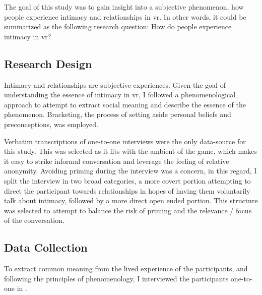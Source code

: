 
The goal of this study was to gain insight into a subjective phenomenon, how people experience intimacy and relationships in \gls{vr}.
In other words, it could be summarized as the following research question: How do people experience intimacy in \gls{vr}?


\subsection{Research Design}

Intimacy and relationships are subjective experiences. Given the goal of understanding the essence of intimacy in \gls{vr}, I followed a phenomenological approach to attempt to extract social meaning and describe the essence of the phenomenon.
Bracketing, \ie the process of setting aside personal beliefs and preconceptions, was employed.

Verbatim transcriptions of one-to-one interviews were the only data-source for this study. This was selected as it fits with the ambient of the game, which makes it easy to strike informal conversation and leverage the feeling of relative anonymity.
Avoiding priming during the interview was a concern, in this regard, I split the interview in two broad categories, a more covert portion attempting to direct the participant towards relationships in hopes of having them voluntarily talk about intimacy, followed by a more direct open ended portion. This structure was selected to attempt to balance the risk of priming and the relevance / focus of the conversation.


\subsection{Data Collection}
To extract common meaning from the lived experience of the participants, and following the principles of phenomenology, I interviewed the participants one-to-one in \vrc.

